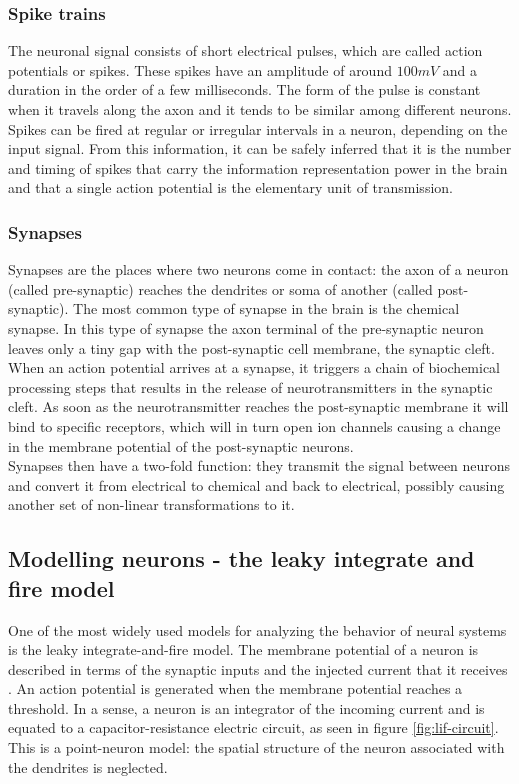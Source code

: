     \subsubsection{Spike trains}
    The neuronal signal consists of short electrical pulses, which are called action potentials or spikes.
    These spikes have an amplitude of around $100mV$ and a duration in the order of a few milliseconds.
    The form of the pulse is constant when it travels along the axon and it tends to be similar among different neurons.
    Spikes can be fired at regular or irregular intervals in a neuron, depending on the input signal.
    From this information, it can be safely inferred that it is the number and timing of spikes that carry the information representation power in the brain and that a single action potential is the elementary unit of transmission.

    \subsubsection{Synapses}
    Synapses are the places where two neurons come in contact: the axon of a neuron (called pre-synaptic) reaches the dendrites or soma of another (called post-synaptic).
    The most common type of synapse in the brain is the chemical synapse.
    In this type of synapse the axon terminal of the pre-synaptic neuron leaves only a tiny gap with the post-synaptic cell membrane, the synaptic cleft.
    When an action potential arrives at a synapse, it triggers a chain of biochemical processing steps that results in the release of neurotransmitters in the synaptic cleft.
    As soon as the neurotransmitter reaches the post-synaptic membrane it will bind to specific receptors, which will in turn open ion channels causing a change in the membrane potential of the post-synaptic neurons.\\
    Synapses then have a two-fold function: they transmit the signal between neurons and convert it from electrical to chemical and back to electrical, possibly causing another set of non-linear transformations to it.

  \subsection{Modelling neurons - the leaky integrate and fire model}
  One of the most widely used models for analyzing the behavior of neural systems is the leaky integrate-and-fire model.
  The membrane potential of a neuron is described in terms of the synaptic inputs and the injected current that it receives \cite{lif-review}.
  An action potential is generated when the membrane potential reaches a threshold.
  In a sense, a neuron is an integrator of the incoming current and is equated to a capacitor-resistance electric circuit, as seen in figure \ref{fig:lif-circuit}.
  This is a point-neuron model: the spatial structure of the neuron associated with the dendrites is neglected.

